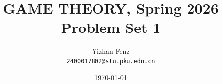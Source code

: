 \title{\textbf{GAME THEORY, Spring 2026} \\[0.5em]
    \Large Problem Set 1}
\author{Yizhan Feng \\ 
    \normalsize{\texttt{2400017802@stu.pku.edu.cn}}}
\date{\today}